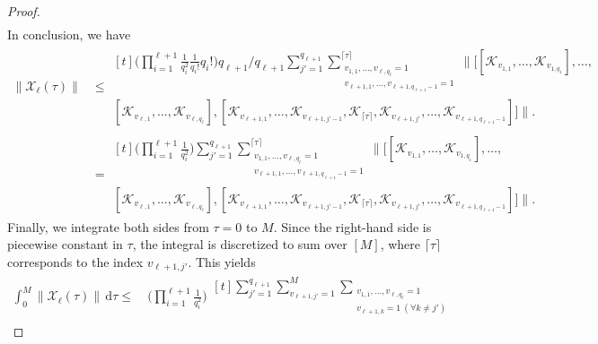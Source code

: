 \documentclass[11pt]{article}
\renewcommand{\d}{\mathrm{d}}
\newcommand{\mc}{\mathcal}
\begin{document}
\begin{proof}
\begin{align*}
\end{align*}
In conclusion, we have
\begin{align*}
    \|\mc X_\ell(\tau)\|&\le \begin{multlined}[t]
        \bigg(\prod_{i=1}^{\ell+1} \frac{1}{q_i^2}\frac{1}{q_i!}q_i!\bigg)q_{\ell+1}/q_{\ell+1}\sum_{j'=1}^{q_{\ell+1}} \sum_{\substack{
                 v_{1,1}, \ldots, v_{\ell, q_\ell} = 1 \\
                 v_{\ell+1, 1}, \ldots, v_{\ell+1, q_{\ell+1}-1} = 1
            }}^{\lceil\tau\rceil} \bigg\| \Big[ 
                [\mc K_{v_{1,1}}, \ldots, \mc K_{v_{1,q_1}}], \ldots, \\ 
                    [\mc K_{v_{\ell,1}}, \ldots, \mc K_{v_{\ell,q_\ell}}], 
                    [\mc K_{v_{\ell+1,1}}, \ldots, \mc K_{v_{\ell+1,j'-1}},\mc K_{\lceil\tau\rceil},\mc K_{v_{\ell+1,j'}}, \ldots, \mc K_{v_{\ell+1,q_{\ell+1}-1}}]
                \Big] \bigg\|.
    \end{multlined}\\
    &=\begin{multlined}[t]\bigg(\prod_{i=1}^{\ell+1} \frac{1}{q_i^2}\bigg)
        \sum_{j'=1}^{q_{\ell+1}} \sum_{\substack{
                 v_{1,1}, \ldots, v_{\ell, q_\ell} = 1 \\
                 v_{\ell+1, 1}, \ldots, v_{\ell+1, q_{\ell+1}-1} = 1
            }}^{\lceil\tau\rceil} \bigg\| \Big[ 
                [\mc K_{v_{1,1}}, \ldots, \mc K_{v_{1,q_1}}], \ldots, \\ 
                    [\mc K_{v_{\ell,1}}, \ldots, \mc K_{v_{\ell,q_\ell}}], 
                    [\mc K_{v_{\ell+1,1}}, \ldots, \mc K_{v_{\ell+1,j'-1}},\mc K_{\lceil\tau\rceil},\mc K_{v_{\ell+1,j'}}, \ldots, \mc K_{v_{\ell+1,q_{\ell+1}-1}}]
                \Big] \bigg\|.
    \end{multlined}
\end{align*}
Finally, we integrate both sides from $\tau=0$ to $M$.  Since the right-hand side is piecewise constant in $\tau$, the integral is discretized to sum over $[M]$, where $\lceil\tau\rceil$ corresponds to the index $v_{\ell+1, j'}$. This yields 
\begin{align*}
    \int_{0}^{M} \|\mc{X}_{\ell}(\tau)\| \,\d\tau 
     \le & ~ \bigg(\prod_{i=1}^{\ell+1} \frac{1}{q_i^2}\bigg)\begin{multlined}[t]
    \sum_{j'=1}^{q_{\ell+1}}\sum_{v_{\ell+1,j'}=1}^{M} 
    \sum_{\substack{
                 v_{1,1}, \ldots, v_{\ell, q_\ell} = 1 \\
                 v_{\ell+1, k} = 1 ~(\forall k \neq j')
}}
\end{multlined}
\end{align*}
\end{proof}
\end{document}
